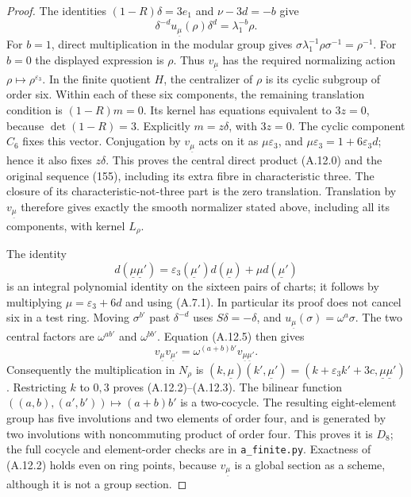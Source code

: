 \begin{proof}
The identities $(1-R)\delta=3e_1$ and $\nu-3d=-b$ give
\[
 \delta^{-d}u_{\underline\mu}(\rho)\delta^d
   =\lambda_1^{-b}\rho.
\]
For $b=1$, direct multiplication in the modular group gives
$\sigma\lambda_1^{-1}\rho\sigma^{-1}=\rho^{-1}$.
For $b=0$ the displayed expression is $\rho$.
Thus $v_{\underline\mu}$ has the required normalizing action
$\rho\mapsto\rho^{\varepsilon_3}$.
In the finite quotient $H$, the centralizer of $\rho$ is its cyclic
subgroup of order six. Within each of these six components, the
remaining translation condition is $(1-R)m=0$. Its kernel has
equations equivalent to $3z=0$, because $\det(1-R)=3$.
Explicitly $m=z\delta$, with $3z=0$. The cyclic component
$C_6$ fixes this vector. Conjugation by $v_{\underline\mu}$
acts on it as $\mu\varepsilon_3$, and
$\mu\varepsilon_3=1+6\varepsilon_3d$; hence it also fixes
$z\delta$. This proves the central direct product (A.12.0)
and the original sequence (155), including its extra fibre
in characteristic three.
The closure of its characteristic-not-three part is the zero
translation. Translation by $v_{\underline\mu}$ therefore gives
exactly the smooth normalizer stated above, including all its
components, with kernel $L_\rho$.

The identity
\[
 d(\underline\mu\underline\mu')
   =\varepsilon_3(\underline\mu')d(\underline\mu)
      +\mu d(\underline\mu')                     \tag{A.12.5}
\]
is an integral polynomial identity on the sixteen pairs of charts;
it follows by multiplying $\mu=\varepsilon_3+6d$ and using (A.7.1).
In particular its proof does not cancel six in a test ring. Moving
$\sigma^{b'}$ past $\delta^{-d}$ uses $S\delta=-\delta$, and
$u_{\underline\mu}(\sigma)=\omega^a\sigma$. The two central factors
are $\omega^{ab'}$ and $\omega^{bb'}$. Equation (A.12.5) then gives
\[
 v_{\underline\mu}v_{\underline\mu'}
     =\omega^{(a+b)b'}v_{\underline\mu\underline\mu'}.
\]
Consequently the multiplication in $N_\rho$ is
$(k,\underline\mu)(k',\underline\mu')
=(k+\varepsilon_3k'+3c,\underline\mu\underline\mu')$.
Restricting $k$ to $0,3$ proves (A.12.2)--(A.12.3).
The bilinear function $((a,b),(a',b'))\mapsto(a+b)b'$ is a
two-cocycle. The resulting eight-element group has five involutions
and two elements of order four, and is generated by two involutions
with noncommuting product of order four. This proves it is $D_8$;
the full cocycle and element-order checks are in
\texttt{a\_finite.py}. Exactness of (A.12.2) holds even on ring
points, because $v_{\underline\mu}$ is a global section as a scheme,
although it is not a group section.


\end{proof}
